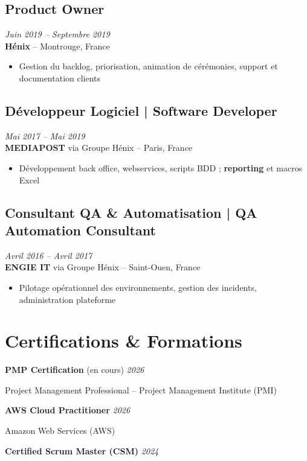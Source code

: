 \documentclass[11pt,a4paper]{article}
\begin{document}
\subsection*{Product Owner} \hfill \textit{Juin 2019 -- Septembre 2019}\\
\textbf{Hénix} -- Montrouge, France
\begin{itemize}
    \item Gestion du backlog, priorisation, animation de cérémonies, support et documentation clients
\end{itemize}

\subsection*{Développeur Logiciel | Software Developer} \hfill \textit{Mai 2017 -- Mai 2019}\\
\textbf{MEDIAPOST} via Groupe Hénix -- Paris, France
\begin{itemize}
    \item Développement back office, webservices, scripts BDD ; \textbf{reporting} et macros Excel
\end{itemize}

\subsection*{Consultant QA \& Automatisation | QA Automation Consultant} \hfill \textit{Avril 2016 -- Avril 2017}\\
\textbf{ENGIE IT} via Groupe Hénix -- Saint-Ouen, France
\begin{itemize}
    \item Pilotage opérationnel des environnements, gestion des incidents, administration plateforme
\end{itemize}

\section*{Certifications \& Formations}

\textbf{PMP Certification} (en cours) \hfill \textit{2026}

Project Management Professional -- Project Management Institute (PMI)

\textbf{AWS Cloud Practitioner} \hfill \textit{2026}

Amazon Web Services (AWS)

\textbf{Certified Scrum Master (CSM)} \hfill \textit{2024}
\end{document}
